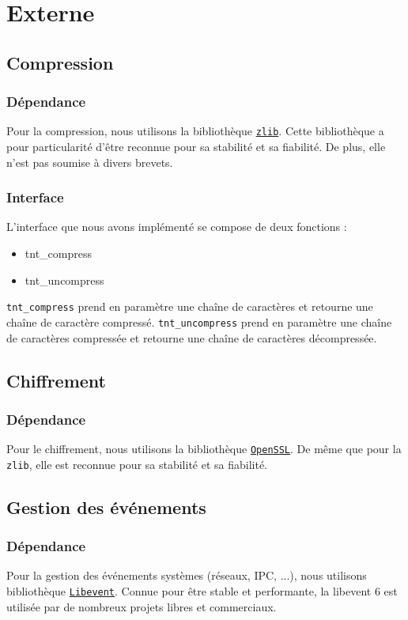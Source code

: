 ﻿\section{Externe}
\subsection{Compression}
\subsubsection{Dépendance}
Pour la compression, nous utilisons la bibliothèque \href{http://zlib.net/}{\texttt{zlib}}.
Cette bibliothèque a pour particularité d'être reconnue pour sa stabilité et sa fiabilité.
De plus, elle n'est pas soumise à divers brevets.

\subsubsection{Interface}
L'interface que nous avons implémenté se compose de deux fonctions :
\begin{itemize}
\item tnt\_compress
\item tnt\_uncompress
\end{itemize}

\texttt{tnt\_compress} prend en paramètre une chaîne de caractères et retourne une chaîne de caractère compressé.
\texttt{tnt\_uncompress} prend en paramètre une chaîne de caractères compressée et retourne une chaîne de caractères décompressée.

\subsection{Chiffrement}
\subsubsection{Dépendance}
Pour le chiffrement, nous utilisons la bibliothèque \href{http://www.openssl.org/}{\texttt{OpenSSL}}.
De même que pour la \texttt{zlib}, elle est reconnue pour sa stabilité et sa fiabilité.


\subsection{Gestion des événements}
\subsubsection{Dépendance}
Pour la gestion des événements systèmes (réseaux, IPC, ...), nous utilisons bibliothèque \href{http://libevent.org/}{\texttt{Libevent}}.
Connue pour être stable et performante, la libevent 6 est utilisée
par de nombreux projets libres et commerciaux.
